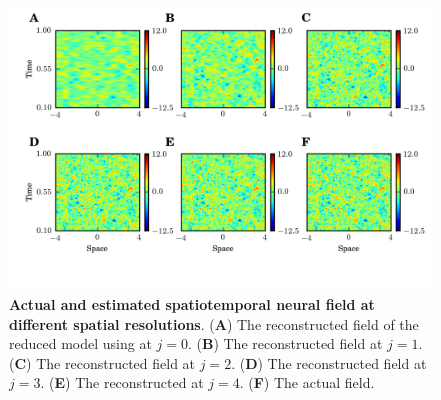 \documentclass[review,authoryear,3p]{elsarticle}
\begin{document}
\begin{figure}[t]
	\centering
		\includegraphics[scale=1]{./Graph/STMultiRes.png}
	\caption{{\bf Actual and estimated spatiotemporal neural field at different spatial resolutions}. (\textbf{A}) The reconstructed field of the reduced model using at $j=0$. (\textbf{B}) The reconstructed field at $j=1$. (\textbf{C}) The reconstructed field at $j=2$. (\textbf{D}) The reconstructed field at $j=3$. (\textbf{E}) The reconstructed at $j=4$. (\textbf{F}) The actual field.}
	\label{fig:FieldEstimation}
\end{figure}
\end{document}
